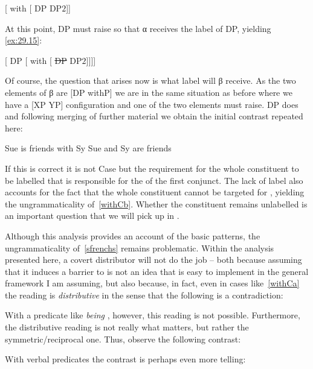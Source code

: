 \documentclass[output=paper]{langsci/langscibook}
\begin{document}
\ea\label{ex:29.14}
    {}[ with [ DP DP$2$]]
\z

At this point, DP must raise so that α receives the label of DP,
yielding \eqref{ex:29.15}:

\ea\label{ex:29.15}
    {}[ DP [ with [ \sout{DP} DP$2$]]]]
\z

Of course, the question that arises now is what label will β receive. As the
two elements of β are [DP withP] we are in the same situation as before
where we have a [XP YP] configuration and one of the two elements must raise.
DP does and following merging of further material we obtain the initial
contrast repeated here:

\ea\label{ex:29.16}
    \ea Sue is friends with Sy
    \ex Sue and Sy are friends
    \z
\z

If this is correct it is not Case but the requirement for the whole constituent
to be labelled that is responsible for the  of the first
conjunct. The lack of label also accounts for the fact that the whole
constituent cannot be targeted for , yielding the
ungrammaticality of~\eqref{withCb}. Whether the constituent remains unlabelled
is an important question that we will pick up in .

Although this analysis provides an account of the basic patterns, the
ungrammaticality of~\eqref{sfrenchs} remains problematic. Within the analysis
presented here, a co\-vert distributor will not do the job -- both because
assuming that it induces a barrier to  is not an idea that is
easy to implement in the general framework I am assuming, but also because, in
fact, even in cases like~\eqref{withCa} the reading is \emph{distributive} in
the sense that the following is a contradiction:

\label{ex:29.17}
\z

With a predicate like \emph{being }, however, this reading is not
possible. Furthermore, the distributive reading is not really what matters, but
rather the symmetric/reciprocal one. Thus, observe the following contrast:

\ea\label{ex:29.18}
    \z
\z

With verbal predicates the contrast is perhaps even more telling:
\end{document}
